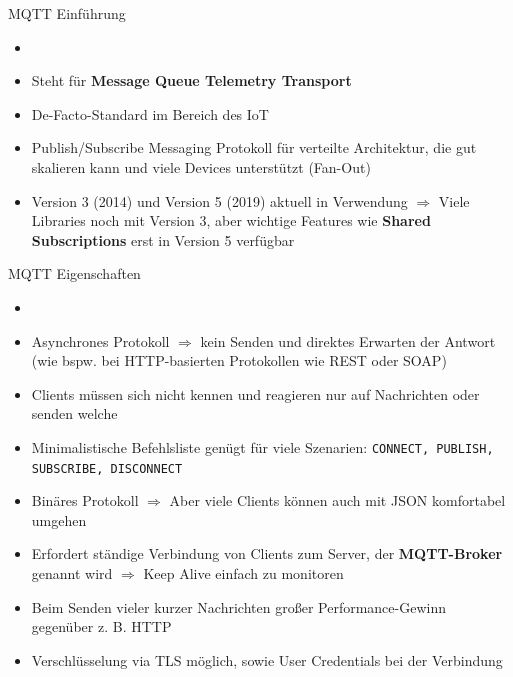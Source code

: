 \begin{frame}{MQTT Einführung}
     \begin{itemize}
        \setlength{\itemindent}{0.4in}
        \item [\textbf{MQTT}]
    \end{itemize}
    \begin{itemize}
        \item Steht für \textbf{Message Queue Telemetry Transport}
        \item De-Facto-Standard im Bereich des IoT
        \item Publish/Subscribe Messaging Protokoll für verteilte Architektur, die gut skalieren kann und viele Devices unterstützt (Fan-Out)
        \item Version 3 (2014) und Version 5 (2019) aktuell in Verwendung $\Rightarrow$ Viele Libraries noch mit Version 3, aber wichtige Features wie \textbf{Shared Subscriptions} erst in Version 5 verfügbar
    \end{itemize}  
\end{frame}

\begin{frame}{MQTT Eigenschaften}
         \begin{itemize}
        \setlength{\itemindent}{1.28in}
        \item [\textbf{MQTT Eigenschaften}]
    \end{itemize}
    \begin{itemize}
        \item Asynchrones Protokoll  $\Rightarrow$  kein Senden und direktes Erwarten der Antwort (wie bspw. bei HTTP-basierten Protokollen wie REST oder SOAP)
        \item Clients müssen sich nicht kennen und reagieren nur auf Nachrichten oder senden welche    
        \item Minimalistische Befehlsliste genügt für viele Szenarien: \texttt{CONNECT, PUBLISH, SUBSCRIBE,  DISCONNECT}
        \item Binäres Protokoll  $\Rightarrow$  Aber viele Clients können auch mit JSON komfortabel umgehen
        \item Erfordert ständige Verbindung von Clients zum Server, der \textbf{MQTT-Broker} genannt wird $\Rightarrow$ Keep Alive einfach zu monitoren
        \item Beim Senden vieler kurzer Nachrichten großer Performance-Gewinn gegenüber z. B. HTTP
        \item Verschlüsselung via TLS möglich, sowie User Credentials bei der Verbindung
    \end{itemize}  
\end{frame}


